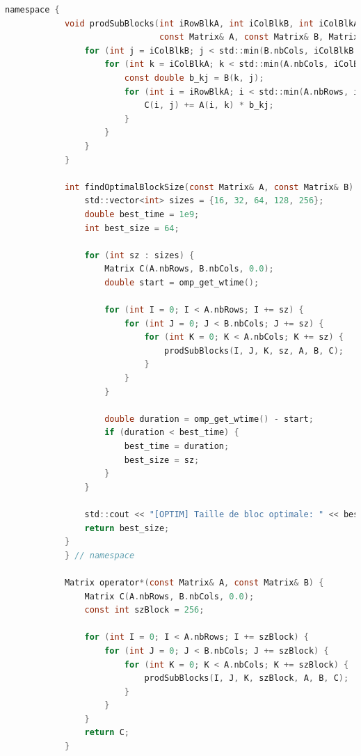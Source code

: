 \documentclass[a4paper,13pt]{book}
\begin{document}
	\begin{lstlisting}[language=C]
        namespace {
            void prodSubBlocks(int iRowBlkA, int iColBlkB, int iColBlkA, int szBlock,
                               const Matrix& A, const Matrix& B, Matrix& C) {
                for (int j = iColBlkB; j < std::min(B.nbCols, iColBlkB + szBlock); ++j) {
                    for (int k = iColBlkA; k < std::min(A.nbCols, iColBlkA + szBlock); ++k) {
                        const double b_kj = B(k, j); 
                        for (int i = iRowBlkA; i < std::min(A.nbRows, iRowBlkA + szBlock); ++i) {
                            C(i, j) += A(i, k) * b_kj;
                        }
                    }
                }
            }
            
            int findOptimalBlockSize(const Matrix& A, const Matrix& B) {
                std::vector<int> sizes = {16, 32, 64, 128, 256};
                double best_time = 1e9;
                int best_size = 64; 
            
                for (int sz : sizes) {
                    Matrix C(A.nbRows, B.nbCols, 0.0);
                    double start = omp_get_wtime();
                    
                    for (int I = 0; I < A.nbRows; I += sz) {
                        for (int J = 0; J < B.nbCols; J += sz) {
                            for (int K = 0; K < A.nbCols; K += sz) {
                                prodSubBlocks(I, J, K, sz, A, B, C);
                            }
                        }
                    }
                    
                    double duration = omp_get_wtime() - start;
                    if (duration < best_time) {
                        best_time = duration;
                        best_size = sz;
                    }
                }
                
                std::cout << "[OPTIM] Taille de bloc optimale: " << best_size << std::endl;
                return best_size;
            }
            } // namespace

            Matrix operator*(const Matrix& A, const Matrix& B) {
                Matrix C(A.nbRows, B.nbCols, 0.0);
                const int szBlock = 256;
            
                for (int I = 0; I < A.nbRows; I += szBlock) {      
                    for (int J = 0; J < B.nbCols; J += szBlock) {   
                        for (int K = 0; K < A.nbCols; K += szBlock) { 
                            prodSubBlocks(I, J, K, szBlock, A, B, C);
                        }
                    }
                }
                return C;
            }
\end{lstlisting}
\end{document}
